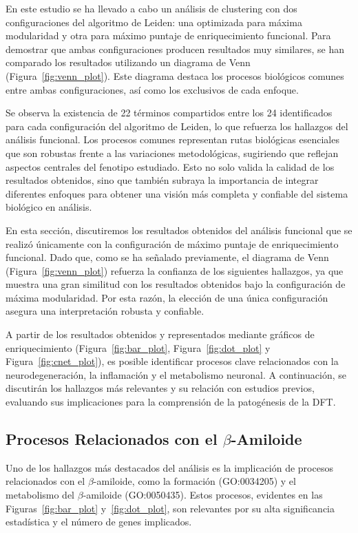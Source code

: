 En este estudio se ha llevado a cabo un análisis de clustering con dos configuraciones del algoritmo de Leiden: una optimizada para máxima modularidad y otra para máximo puntaje de enriquecimiento funcional. Para demostrar que ambas configuraciones producen resultados muy similares, se han comparado los resultados utilizando un diagrama de Venn (Figura~\ref{fig:venn_plot}). Este diagrama destaca los procesos biológicos comunes entre ambas configuraciones, así como los exclusivos de cada enfoque.

Se observa la existencia de 22 términos compartidos entre los 24 identificados para cada configuración del algoritmo de Leiden, lo que refuerza los hallazgos del análisis funcional. Los procesos comunes representan rutas biológicas esenciales que son robustas frente a las variaciones metodológicas, sugiriendo que reflejan aspectos centrales del fenotipo estudiado. Esto no solo valida la calidad de los resultados obtenidos, sino que también  subraya la importancia de integrar diferentes enfoques para obtener una visión más completa y confiable del sistema biológico en análisis.

En esta sección, discutiremos los resultados obtenidos del análisis funcional que se realizó únicamente con la configuración de máximo puntaje de enriquecimiento funcional. Dado que, como se ha señalado previamente, el diagrama de Venn (Figura~\ref{fig:venn_plot}) refuerza la confianza de los siguientes hallazgos, ya que muestra una gran similitud con los resultados obtenidos bajo la configuración de máxima modularidad. Por esta razón, la elección de una única configuración asegura una interpretación robusta y confiable.

A partir de los resultados obtenidos y representados mediante gráficos de enriquecimiento (Figura~\ref{fig:bar_plot}, Figura~\ref{fig:dot_plot} y Figura~\ref{fig:cnet_plot}), es posible identificar procesos clave relacionados con la neurodegeneración, la inflamación y el metabolismo neuronal. A continuación, se discutirán los hallazgos más relevantes y su relación con estudios previos, evaluando sus implicaciones para la comprensión de la patogénesis de la DFT.

\subsection{Procesos Relacionados con el \(\beta\)-Amiloide}

Uno de los hallazgos más destacados del análisis es la implicación de procesos relacionados con el \(\beta\)-amiloide, como la formación (GO:0034205) y el metabolismo del \(\beta\)-amiloide (GO:0050435). Estos procesos, evidentes en las Figuras~\ref{fig:bar_plot} y~\ref{fig:dot_plot}, son relevantes por su alta significancia estadística y el número de genes implicados.

